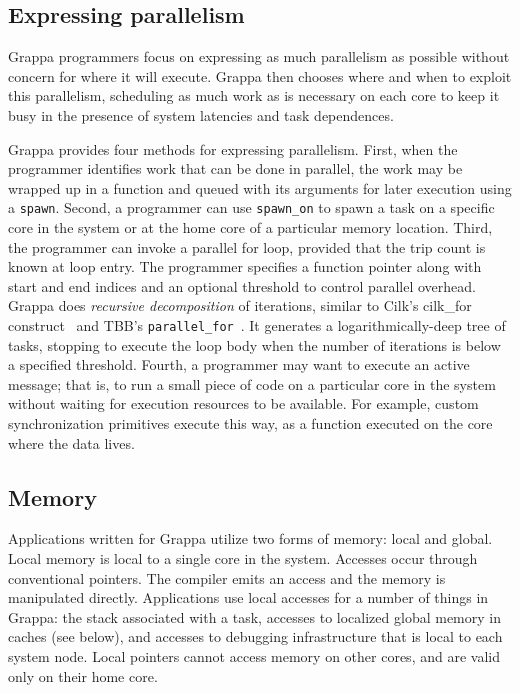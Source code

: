 \subsection{Expressing parallelism}

Grappa programmers focus on expressing as much parallelism as possible without concern for where it will execute. Grappa then chooses where and when to exploit this parallelism, scheduling as much work as is necessary on each core to keep it busy in the presence of system latencies and task dependences.

Grappa provides four methods for expressing parallelism. First, when the programmer identifies work that can be done in parallel, the work may be wrapped up in a function and queued with its arguments for later execution using a \texttt{spawn}. Second, a programmer can use \texttt{spawn\_on} to spawn a task on a specific core in the system or at the home core of a particular memory location. Third, the programmer can invoke a parallel for loop, provided that the trip count is known at loop entry. The programmer specifies a function pointer along with start and end indices and an optional threshold to control parallel overhead. Grappa does {\em recursive decomposition} of iterations, similar to Cilk's cilk\_for construct~\cite {cilkforimplementation} and TBB's {\tt parallel\_for}~\cite{intel_tbb}.  It generates a logarithmically-deep tree of tasks, stopping to execute the loop body when the number of iterations is below a specified threshold. Fourth, a programmer may want to execute an active message; that is, to run a small piece of code on a particular core in the system without waiting for execution resources to be available.  For example, custom synchronization primitives execute this way, as a function executed on the core where the data lives.

\subsection{Memory}

Applications written for Grappa utilize two forms of memory: local and global.  Local memory is local to a single core in the system.  Accesses occur through conventional pointers.  The compiler emits an access and the memory is manipulated directly.  Applications use local accesses for a number of things in Grappa: the stack associated with a task, accesses to localized global memory in caches (see below), and accesses to debugging infrastructure that is local to each system node.  Local pointers cannot access memory on other cores, and are valid only on their home core.

